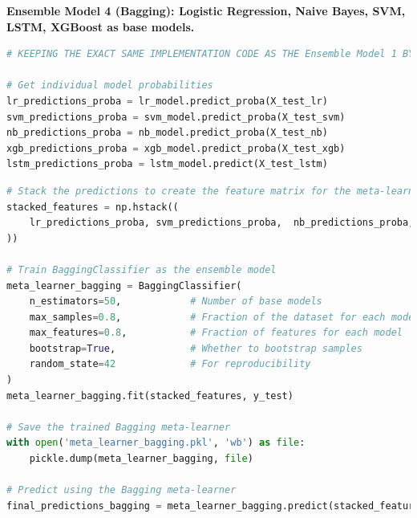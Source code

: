 \vspace{1em}

\noindent
\textbf{Ensemble Model 4 (Bagging): Logistic Regression, Naive Bayes, SVM, LSTM, XGBoost as base models. }
\vspace{1em}
\noindent
\begin{tcolorbox}[colback=gray!5!white, colframe=gray!80!black, boxrule=0.5pt, title=Evaluate Bagging Meta-Learner and Ensemble Model 4]
    \begin{lstlisting}[language=Python]
# KEEPING THE EXACT SAME IMPLEMENTATION CODE AS THE Ensemble Model 1 BY IMPORTING THE NECESSARY LIBRARIES, LOADING THE MODELS, AND PREPROCESSING THE DATA

# Get individual model probabilities
lr_predictions_proba = lr_model.predict_proba(X_test_lr)
svm_predictions_proba = svm_model.predict_proba(X_test_svm)
nb_predictions_proba = nb_model.predict_proba(X_test_nb)
xgb_predictions_proba = xgb_model.predict_proba(X_test_xgb)
lstm_predictions_proba = lstm_model.predict(X_test_lstm)
\end{lstlisting}
\end{tcolorbox}
\begin{tcolorbox}[colback=gray!5!white, colframe=gray!80!black, boxrule=0.5pt, title=Evaluate Meta-Learner and Ensemble Model 4]
    \begin{lstlisting}[language=Python]
# Stack the predictions to create the feature matrix for the meta-learner
stacked_features = np.hstack((
    lr_predictions_proba, svm_predictions_proba,  nb_predictions_proba, xgb_predictions_proba,  lstm_predictions_proba
)) 
        
# Train BaggingClassifier as the ensemble model
meta_learner_bagging = BaggingClassifier(
    n_estimators=50,            # Number of base models
    max_samples=0.8,            # Fraction of the dataset for each model
    max_features=0.8,           # Fraction of features for each model
    bootstrap=True,             # Whether to bootstrap samples
    random_state=42             # For reproducibility
)
meta_learner_bagging.fit(stacked_features, y_test)

# Save the trained Bagging meta-learner
with open('meta_learner_bagging.pkl', 'wb') as file:
    pickle.dump(meta_learner_bagging, file)

# Predict using the Bagging meta-learner
final_predictions_bagging = meta_learner_bagging.predict(stacked_features)
    \end{lstlisting}
\end{tcolorbox}

